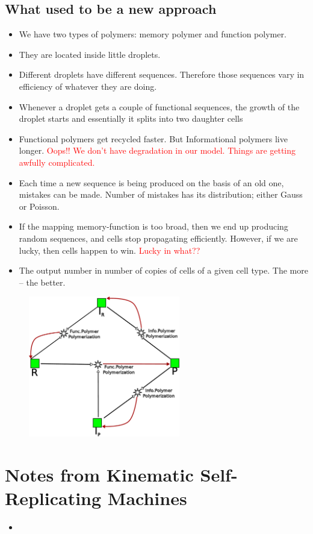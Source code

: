 \documentclass[12pt]{paper}
\newcommand{\red}[1]{\textcolor{red}{#1}}
\begin{document}
\subsection{What used to be a new approach}
\begin{itemize}
 \item 
We have two types of polymers: memory polymer and function polymer. 
\item They are located inside little 
droplets. 
\item Different droplets have different sequences. Therefore those sequences vary in efficiency of
whatever they are doing.
\item Whenever a droplet gets a couple of functional sequences, the growth of the droplet starts and
essentially it splits into two daughter cells
\item Functional polymers get recycled faster. But Informational polymers live longer.
\red{Oops!! We don't have degradation in our model. Things are getting awfully complicated.}
\item Each time a new sequence is being produced on the basis of an old one, mistakes can be made. 
Number of mistakes has its distribution; either Gauss or Poisson.  
\item If the mapping memory-function is too broad, then we end up producing random sequences, and 
cells stop propagating efficiently. However, if we are lucky, then cells happen to win. \red{Lucky 
in what??}
\item The output number in number of copies of cells of a given cell type. The more -- the better.
\end{itemize}

\begin{figure}[h!]
 \centering
\includegraphics[width=0.59\textwidth]{pictures/info-func-porymers-newview.pdf}
\end{figure}

\section{Notes from Kinematic Self-Replicating Machines \cite{Freitas2004}}
\begin{itemize}
 \item 
\end{itemize}


 
\end{document}
